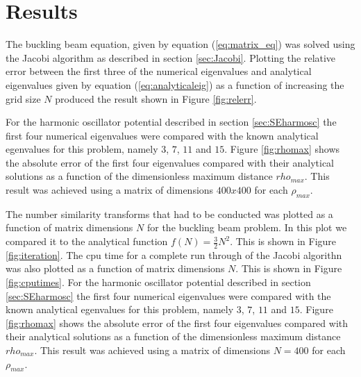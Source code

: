 \documentclass[twocolumn]{aastex62}
\begin{document}
\section{Results} \label{sec:results}
The buckling beam equation, given by equation (\ref{eq:matrix_eq}) was solved using the Jacobi algorithm as described in section \ref{sec:Jacobi}. Plotting the relative error between the first three of the numerical eigenvalues and analytical eigenvalues given by equation (\ref{eq:analyticaleig}) as a function of increasing the grid size $N$ produced the result shown in Figure \ref{fig:relerr}.\\\indent
\begin{figure*}[h]
	\caption{Figure showing the relative error between the numerical and analytical eigenvalues given by equation \ref{eq:analyticaleig} for the buckling beam problem given by \ref{eq:matrix_eq}. }
	\label{fig:relerr}
\end{figure*}
For the harmonic oscillator potential described in section \ref{sec:SEharmosc} the first four numerical eigenvalues were compared with the known analytical egenvalues for this problem, namely $3$, $7$, $11$ and $15$. Figure \ref{fig:rhomax} shows the absolute error of the first four eigenvalues compared with their analytical solutions as a function of the dimensionless maximum distance $rho_{max}$. This result was achieved using a matrix of dimensions $400x400$ for each $\rho_{max}$.\\\indent
\begin{figure*}[h]
	\caption{Figure showing the number of similarity transforms conducted before the off-diagonal elements are set below a tolerance when solving the buckling beam problem using the Jacobi algorithm.}
	\label{fig:iteration}
\end{figure*}
\begin{figure*}[h]
	\caption{Figure showing the CPU time as a function of matrix dimension $N$ when solving the buckling beam problem with the jacobi algorithm. The data is compared with the analytical function $f(N)=\frac{3}{2}N^2$.}
	\label{fig:cputimes}
\end{figure*}
The number similarity transforms that had to be conducted was plotted as a function of matrix dimensions $N$ for the buckling beam problem. In this plot we compared it to the analytical function $f(N)=\frac{3}{2}N^2$. This is shown in Figure \ref{fig:iteration}. The cpu time for a complete run through of the Jacobi algorithn was also plotted as a function of matrix dimensions $N$.  This is shown in Figure \ref{fig:cputimes}. For the harmonic oscillator potential described in section \ref{sec:SEharmosc} the first four numerical eigenvalues were compared with the known analytical egenvalues for this problem, namely $3$, $7$, $11$ and $15$. Figure \ref{fig:rhomax} shows the absolute error of the first four eigenvalues compared with their analytical solutions as a function of the dimensionless maximum distance $rho_{max}$. This result was achieved using a matrix of dimensions $N=400$ for each $\rho_{max}$.\\\indent
\end{document}
